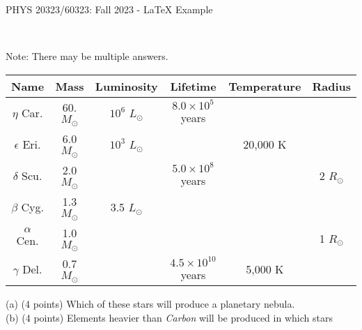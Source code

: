 \documentclass[12pt]{article}
\begin{document}
\def\pos{\medskip\quad}
\def\subpos{\smallskip \qquad}

\begin{center}
{\LARGE
PHYS 20323/60323: Fall 2023 - LaTeX Example
}\\
\end{center}
 \

Note: There may be multiple answers. \

\begin{center}
\begin{tabular}{|c|c|c|c|c|c|}
\hline
Name & Mass & Luminosity & Lifetime & Temperature & Radius \\
\hline
$\eta$ Car.   & 60. \textsl{$M_\odot$}   &  $10^6$ \textsl{$L_\odot$}  & $8.0\times10^5$ years & &  \\
\hline
$\epsilon$ Eri.   & 6.0 \textsl{$M_\odot$}   &  $10^3$ \textsl{$L_\odot$}  &  & 20,000 K &  \\
\hline
$\delta$ Scu.   & 2.0 \textsl{$M_\odot$}   &  & $5.0\times10^8$ years & & 2 \textsl{$R_\odot$}  \\
\hline
$\beta$ Cyg.   & 1.3 \textsl{$M_\odot$}   &  3.5 \textsl{$L_\odot$}  &  & &  \\
\hline
$\alpha$ Cen.   & 1.0 \textsl{$M_\odot$}   &  &  & & 1 \textsl{$R_\odot$} \\
\hline
$\gamma$ Del.   & 0.7 \textsl{$M_\odot$}   &   & $4.5\times10^{10}$ years & 5,000 K &  \\
\hline
\end{tabular}\vskip 0.2in
\end{center}


(a) (4 points) Which of these stars will produce a planetary nebula.\\


(b) (4 points) Elements heavier than \textit{Carbon} will be produced in which stars \\

 \\
\end{document}
